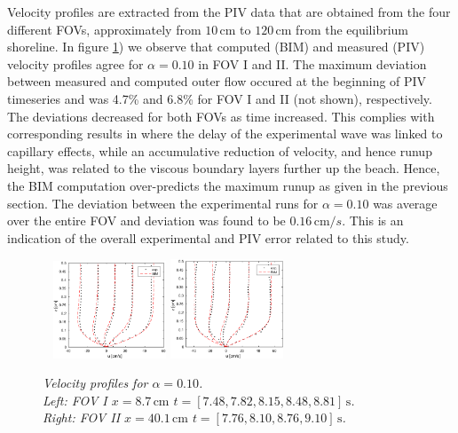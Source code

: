 \documentclass[review, authoryear]{elsarticle}
\newcommand{\s}{\,\mbox{s}}
\newcommand{\cm}{\,\mbox{cm}}
\begin{document}
Velocity profiles are extracted from the PIV data that are obtained from the four different FOVs, 
approximately from $10\cm$ to $120\cm$ from the equilibrium shoreline. 
In figure \ref{fig:BIM3_tim}) we observe that computed (BIM) and measured (PIV) velocity profiles agree for $\alpha=0.10$ in FOV I and II.  The maximum deviation between measured and computed outer flow occured at the beginning of PIV timeseries and was 4.7\% and 6.8\% for FOV I and II (not shown), respectively. The deviations decreased for both FOVs as time increased.  This complies with corresponding results in \cite{pedersen2013runup} where the
delay of the experimental wave was linked to capillary effects, while
an accumulative reduction of velocity, and hence runup height, was
related to the viscous boundary layers further up the beach.  Hence, the BIM 
computation over-predicts the maximum runup as given in the previous section. The deviation between the experimental runs for $\alpha=0.10$ was average over the entire FOV and deviation was found to be $0.16\cm/s$. This is an indication of the overall experimental and PIV error related to this study.  

\begin{figure}
        \centering
        ~ %
                \includegraphics[width=0.3\textwidth]{./Figures/BIM/case10_BIM_PIV_FOV3.eps}
                \includegraphics[width=0.3\textwidth]{./Figures/BIM/case10_BIM_PIV_FOV4.eps}
                \caption{\textit{ Velocity profiles for $\alpha=0.10$.\\ Left: FOV I $x=8.7\cm$ $t=[7.48, 7.82, 8.15, 8.48, 8.81]\s$.\\
                 \quad Right: FOV II $x=40.1\cm$ $t=[7.76, 8.10, 8.76, 9.10]\s$.}}
              \label{fig:BIM3_tim}
      \end{figure}
      
\end{document}
